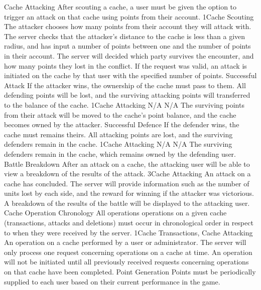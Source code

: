 		\funcreq %
			{Cache Attacking}
			{After scouting a cache, a user must be given the option to 
			trigger an attack on that cache using points from their account.}
			{1}{Cache Scouting}
			{The attacker chooses how many points from their account they will 
			attack with.}
			{The server checks that the attacker's distance to the cache is
			less than a given radius, and has input a number of points between
			one and the number of points in their account. The server will
			decided which party survives the encounter, and how many points
			they lost in the conflict.}
			{If the request was valid, an attack is initiated on the cache by 
			that user with the specified number of points.}
		\funcreq %
			{Successful Attack}
			{If the attacker wins, the ownership of the cache must pass to
			them. All defending points will be lost, and the surviving
			attacking points will transferred to the balance of the cache.}
			{1}{Cache Attacking}
			{N/A}
			{N/A}
			{The surviving points from their attack will be moved to the 
			cache's point balance, and the cache becomes owned by the attacker.
			}
		\funcreq %
			{Successful Defence}
			{If the defender wins, the cache must remains theirs. All attacking 
			points are lost, and the surviving defenders remain in the cache.}
			{1}{Cache Attacking}
			{N/A}
			{N/A}
			{The surviving defenders remain in the cache, which remains owned 
			by the defending user.}
		\funcreq %
			{Battle Breakdown}
			{After an attack on a cache, the attacking user will be able to
			view a breakdown of the results of the attack.}
			{3}{Cache Attacking}
			{An attack on a cache has concluded.}
			{The server will provide information such as the number of units
			lost by each side, and the reward for winning if the attacker was
			victorious.}
			{A breakdown of the results of the battle will be displayed to the
			attacking user.}
		\funcreq %
			{Cache Operation Chronology}
			{All operations operations on a given cache (transactions, attacks
			and deletions) must occur in chronological order in respect to when
			they were received by the server.}
			{1}{Cache Transactions, Cache Attacking}
			{An operation on a cache performed by a user or administrator.}
			{The server will only process one request concerning operations on
			a cache at time.}
			{An operation will not be initiated until all
			previously received requests concerning operations on that cache
			have been completed.}
		\funcreq %
			{Point Generation}
			{Points must be periodically supplied to each user based on their 
			current performance in the game.}
